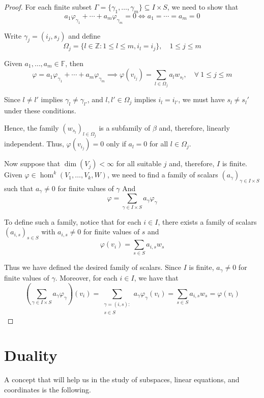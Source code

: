 \begin{proof}
  For each finite subset $\Gamma = \{\gamma_1, \ldots, \gamma_m \} \subseteq I \times S$, we need to show that 
  \[
    a_1 \varphi_{\gamma_1} + \cdots + a_m \varphi_{\gamma_m} = 0 \iff a_1 = \cdots = a_m = 0
  \]

  Write $\gamma_j = (i_j, s_j)$ and define 
  \[
    \Omega_j = \{ l \in \mathbb{Z} : 1 \leq l \leq m, i_l = i_j \}, \quad 1 \leq j \leq m
  \]

  Given $ a_1, \ldots, a_m \in \mathbb{F}$, then 
  \[
    \varphi = a_1 \varphi_{\gamma_1} + \cdots + a_m \varphi_{\gamma_m} \implies \varphi(v_{i_j}) = \sum_{l \in \Omega_j} a_l w_{s_l}, \quad \forall~1 \leq j \leq m
  \]

  Since $l \neq l'$ implies $\gamma_l \neq \gamma_{l'}$, and $l, l' \in \Omega_j$ implies $i_l = i_{l'}$, we must have $s_l \neq s_l'$ under these conditions. 

  Hence, the family $(w_{s_l})_{l \in \Omega_j}$ is a subfamily of $\beta$ and, therefore, linearly independent. Thus, $\varphi(v_{i_j}) = 0$ only if $a_l = 0$ for all $l \in \Omega_j$.

  Now suppose that $\dim(V_j) < \infty$ for all suitable $j$ and, therefore, $I$ is finite. Given $\varphi \in \hom^k(V_1, \ldots, V_k, W)$, we need to find a family of scalars $(a_\gamma)_{\gamma \in I \times S}$ such that $a_\gamma \neq 0$ for finite values of $\gamma$ And
  \[
    \varphi = \sum_{\gamma \in I \times S} a_\gamma \varphi_\gamma
  \]

  To define such a family, notice that for each $i \in I$, there exists a family of scalars $(a_{i,s})_{s \in S}$ with $a_{i, s} \neq 0$ for finite values of $s$ and 
  \[
    \varphi(v_i) = \sum_{s \in S} a_{i,s} w_s
  \]

  Thus we have defined the desired family of scalars. Since $I$ is finite, $a_\gamma \neq 0$ for finite values of $\gamma$. Moreover, for each $i \in I$, we have that 
  \[
    \left( \sum_{\gamma \in I \times S} a_\gamma \varphi_\gamma \right) (v_i) = \sum_{\substack{\gamma=(i,s) : \\ s \in S}} a_\gamma \varphi_\gamma(v_i) = \sum_{s \in S} a_{i,s} w_s = \varphi(v_i)
  \]
\end{proof}

\section{Duality}

A concept that will help us in the study of subspaces, linear equations, and coordinates is the following.

